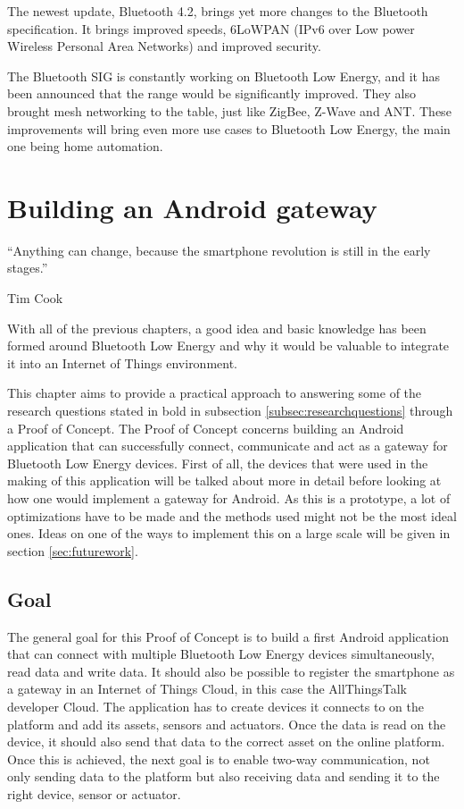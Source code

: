 \documentclass[pdftex,a4paper,12pt,twoside]{report}
\begin{document}
The newest update, Bluetooth 4.2, brings yet more changes to the Bluetooth specification. It brings improved speeds, 6LoWPAN (IPv6 over Low power Wireless Personal Area Networks) and improved security.

The Bluetooth SIG is constantly working on Bluetooth Low Energy, and it has been announced that the range would be significantly improved. They also brought mesh networking to the table, just like ZigBee, Z-Wave and ANT. These improvements will bring even more use cases to Bluetooth Low Energy, the main one being home automation.

\chapter{Building an Android gateway}
\label{ch:android}
\epigraph{``Anything can change, because the smartphone revolution is still in the early stages.''}{Tim Cook}
With all of the previous chapters, a good idea and basic knowledge has been formed around Bluetooth Low Energy and why it would be valuable to integrate it into an Internet of Things environment.

This chapter aims to provide a practical approach to answering some of the research questions stated in bold in subsection \ref{subsec:researchquestions} through a Proof of Concept. The Proof of Concept concerns building an Android application that can successfully connect, communicate and act as a gateway for Bluetooth Low Energy devices. First of all, the devices that were used in the making of this application will be talked about more in detail before looking at how one would implement a gateway for Android. As this is a prototype, a lot of optimizations have to be made and the methods used might not be the most ideal ones. Ideas on one of the ways to implement this on a large scale will be given in section \ref{sec:futurework}.

\newpage{}

\section{Goal}
\label{sec:pocgoal}
The general goal for this Proof of Concept is to build a first Android application that can connect with multiple Bluetooth Low Energy devices simultaneously, read data and write data. It should also be possible to register the smartphone as a gateway in an Internet of Things Cloud, in this case the AllThingsTalk developer Cloud. The application has to create devices it connects to on the platform and add its assets, sensors and actuators. Once the data is read on the device, it should also send that data to the correct asset on the online platform. Once this is achieved, the next goal is to enable two-way communication, not only sending data to the platform but also receiving data and sending it to the right device, sensor or actuator.
\end{document}
